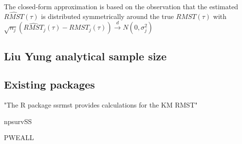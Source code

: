 \documentclass[main.tex]{subfiles}
\begin{document}
The closed-form approximation is based on the observation that the estimated $\hat{RMST}(\tau)$ is distributed symmetrically around the true $RMST(\tau)$ with $\sqrt{n_j}(\hat{RMST}_j(\tau) - RMST_j(\tau)) \xrightarrow{d} N(0, \sigma^2_j)$

\subsection{Liu Yung analytical sample size}


\subsection{Existing packages}
"The R package ssrmst provides calculations for the KM
RMST"

npsurvSS \parencite{Yung2020-ht}

PWEALL

\end{document}
